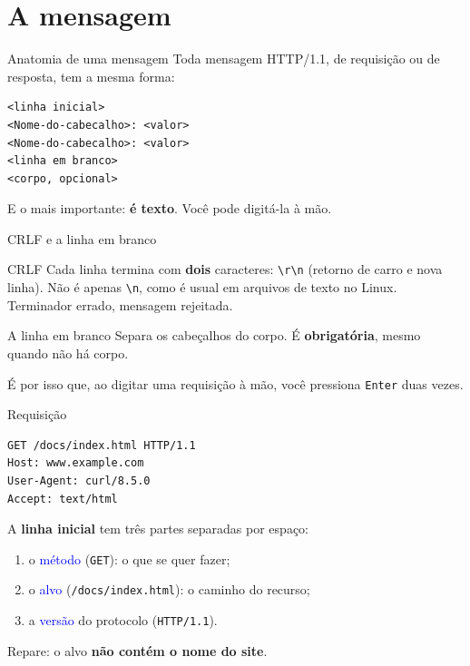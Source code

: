 \documentclass{beamer}
\newcommand{\tcb}[1]{\textcolor{blue}{#1}}
\begin{document}
\section{A mensagem}

\begin{frame}[fragile]{Anatomia de uma mensagem}
  Toda mensagem HTTP/1.1, de requisição ou de resposta, tem a mesma forma:

  \begin{verbatim}
<linha inicial>
<Nome-do-cabecalho>: <valor>
<Nome-do-cabecalho>: <valor>
<linha em branco>
<corpo, opcional>
  \end{verbatim}

  \vspace{0.3cm}
  E o mais importante: \textbf{é texto}. Você pode digitá-la à mão.
\end{frame}

\begin{frame}[fragile]{CRLF e a linha em branco}
  \begin{block}{CRLF}
    Cada linha termina com \textbf{dois} caracteres: \verb|\r\n| (retorno de
    carro e nova linha). Não é apenas \verb|\n|, como é usual em arquivos de
    texto no Linux. Terminador errado, mensagem rejeitada.
  \end{block}

  \begin{block}{A linha em branco}
    Separa os cabeçalhos do corpo. É \textbf{obrigatória}, mesmo quando não há
    corpo.

    \vspace{0.2cm}
    É por isso que, ao digitar uma requisição à mão, você pressiona
    \texttt{Enter} duas vezes.
  \end{block}
\end{frame}

\begin{frame}[fragile]{Requisição}
  \begin{verbatim}
GET /docs/index.html HTTP/1.1
Host: www.example.com
User-Agent: curl/8.5.0
Accept: text/html

  \end{verbatim}

  A \textbf{linha inicial} tem três partes separadas por espaço:
  \begin{enumerate}
    \item o \tcb{método} (\texttt{GET}): o que se quer fazer;
    \item o \tcb{alvo} (\texttt{/docs/index.html}): o caminho do recurso;
    \item a \tcb{versão} do protocolo (\texttt{HTTP/1.1}).
  \end{enumerate}

  \vspace{0.2cm}
  Repare: o alvo \textbf{não contém o nome do site}.
\end{frame}
\end{document}
